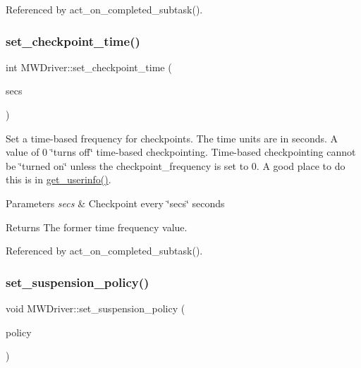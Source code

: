 Referenced by act\+\_\+on\+\_\+completed\+\_\+subtask().

\mbox{\label{classMWDriver_a7f803ede53bb0d797bce81d56a33cdf9}} 
\subsubsection{\texorpdfstring{set\+\_\+checkpoint\+\_\+time()}{set\_checkpoint\_time()}}
{\footnotesize\ttfamily int M\+W\+Driver\+::set\+\_\+checkpoint\+\_\+time (\begin{DoxyParamCaption}\item[{int}]{secs }\end{DoxyParamCaption})}

Set a time-\/based frequency for checkpoints. The time units are in seconds. A value of 0 \char`\"{}turns off\char`\"{} time-\/based checkpointing. Time-\/based checkpointing cannot be \char`\"{}turned 
on\char`\"{} unless the checkpoint\+\_\+frequency is set to 0. A good place to do this is in \hyperlink{classMWDriver_acf0edc86b06b46968114c8bb770791b2}{get\+\_\+userinfo()}. 
\begin{DoxyParams}{Parameters}
{\em secs} & Checkpoint every \char`\"{}secs\char`\"{} seconds \\
\hline
\end{DoxyParams}
\begin{DoxyReturn}{Returns}
The former time frequency value. 
\end{DoxyReturn}


Referenced by act\+\_\+on\+\_\+completed\+\_\+subtask().

\mbox{\label{classMWDriver_a97b4b046a3793d45e28bd1b2fddbd8c1}} 
\subsubsection{\texorpdfstring{set\+\_\+suspension\+\_\+policy()}{set\_suspension\_policy()}}
{\footnotesize\ttfamily void M\+W\+Driver\+::set\+\_\+suspension\+\_\+policy (\begin{DoxyParamCaption}\item[{M\+W\+Suspension\+Policy}]{policy }\end{DoxyParamCaption})}

